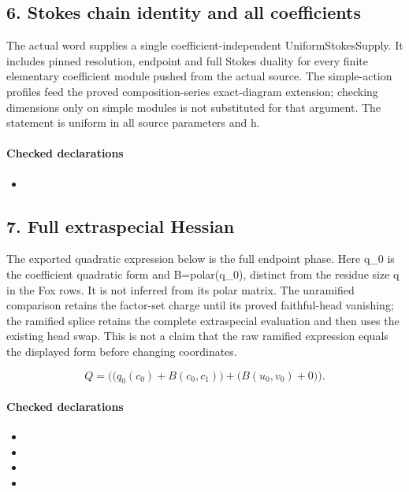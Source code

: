 \subsection*{6. Stokes chain identity and all coefficients}
The actual word supplies a single coefficient-independent UniformStokesSupply. It includes pinned resolution, endpoint and full Stokes duality for every finite elementary coefficient module pushed from the actual source. The simple-action profiles feed the proved composition-series exact-diagram extension; checking dimensions only on simple modules is not substituted for that argument. The statement is uniform in all source parameters and h.

\paragraph{Checked declarations}
\begin{itemize}
\item {}
\end{itemize}

\subsection*{7. Full extraspecial Hessian}
The exported quadratic expression below is the full endpoint phase. Here q\_0 is the coefficient quadratic form and B=polar(q\_0), distinct from the residue size q in the Fox rows. It is not inferred from its polar matrix. The unramified comparison retains the factor-set charge until its proved faithful-head vanishing; the ramified splice retains the complete extraspecial evaluation and then uses the existing head swap. This is not a claim that the raw ramified expression equals the displayed form before changing coordinates.

\[Q=\bigl(\bigl(q_0(c_0)+B(c_0,c_1)\bigr)+\bigl(B(u_{0},v_{0})+0\bigr)\bigr).\]
\paragraph{Checked declarations}
\begin{itemize}
\item {}
\item {}
\item {}
\item {}
\end{itemize}

